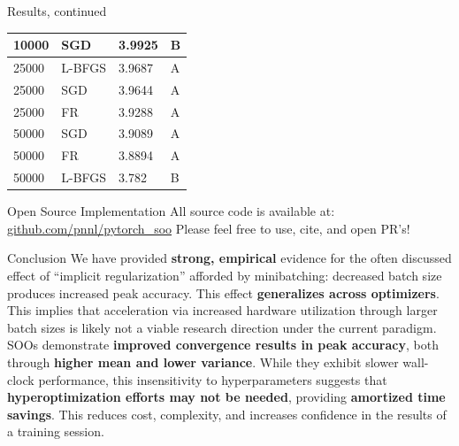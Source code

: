 \documentclass[final]{beamer}
\newlength{\colwidth}
\begin{document}
\begin{frame}[t]
\begin{columns}[t]
\begin{column}{\colwidth}
\begin{block}{Results, continued}
\begin{table}[]
\begin{tabular}{|llll|}
            \multicolumn{1}{|l|}{10000}      & \multicolumn{1}{l|}{SGD}       & \multicolumn{1}{l|}{3.9925}   & B               \\ \hline
            \multicolumn{1}{|l|}{25000}      & \multicolumn{1}{l|}{L-BFGS}    & \multicolumn{1}{l|}{3.9687}   & A               \\
            \multicolumn{1}{|l|}{25000}      & \multicolumn{1}{l|}{SGD}       & \multicolumn{1}{l|}{3.9644}   & A               \\
            \multicolumn{1}{|l|}{25000}      & \multicolumn{1}{l|}{FR}        & \multicolumn{1}{l|}{3.9288}   & A               \\ \hline
            \multicolumn{1}{|l|}{50000}      & \multicolumn{1}{l|}{SGD}       & \multicolumn{1}{l|}{3.9089}   & A               \\
            \multicolumn{1}{|l|}{50000}      & \multicolumn{1}{l|}{FR}        & \multicolumn{1}{l|}{3.8894}   & A               \\
            \multicolumn{1}{|l|}{50000}      & \multicolumn{1}{l|}{L-BFGS}    & \multicolumn{1}{l|}{3.782}    & B               \\ \hline
          \end{tabular}
        \end{table}
      \end{block}

      \begin{exampleblock}{Open Source Implementation}
        All source code is available at: \href{https://github.com/pnnl/pytorch_soo}{github.com/pnnl/pytorch\_soo}\newline
        Please feel free to use, cite, and open PR's!

      \end{exampleblock}


      \begin{block}{Conclusion}
        We have provided \textbf{strong, empirical} evidence for the often discussed effect of
        ``implicit regularization'' afforded by minibatching: decreased batch size produces
        increased peak accuracy. This effect \textbf{generalizes across optimizers}. This implies
        that acceleration via increased hardware utilization through larger batch sizes is likely
        not a viable research direction under the current paradigm. SOOs demonstrate \textbf{improved
          convergence results in peak accuracy}, both through \textbf{higher mean and lower variance}.
        While they exhibit slower wall-clock performance, this insensitivity to hyperparameters
        suggests that \textbf{hyperoptimization efforts may not be needed}, providing
        \textbf{amortized time savings}.  This reduces cost, complexity, and increases confidence in
        the results of a training session.


\end{block}
\end{column}
\end{columns}
\end{frame}
\end{document}
